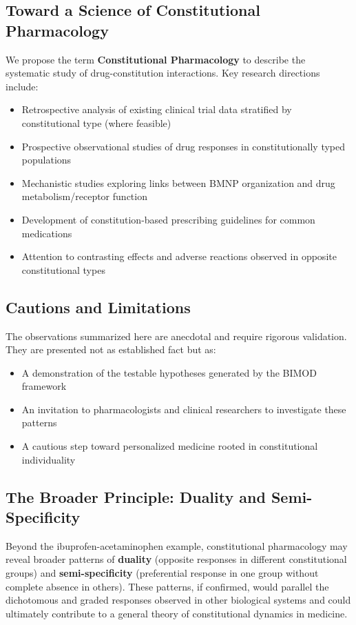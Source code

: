 \documentclass[12pt,a4paper]{article}
\begin{document}
\subsection{Toward a Science of Constitutional Pharmacology}

We propose the term \textbf{Constitutional Pharmacology} to describe the systematic study of drug-constitution interactions. Key research directions include:

\begin{itemize}
    \item Retrospective analysis of existing clinical trial data stratified by constitutional type (where feasible)
    \item Prospective observational studies of drug responses in constitutionally typed populations
    \item Mechanistic studies exploring links between BMNP organization and drug metabolism/receptor function
    \item Development of constitution-based prescribing guidelines for common medications
    \item Attention to contrasting effects and adverse reactions observed in opposite constitutional types
\end{itemize}

\subsection{Cautions and Limitations}

The observations summarized here are anecdotal and require rigorous validation. They are presented not as established fact but as:

\begin{itemize}
    \item A demonstration of the testable hypotheses generated by the BIMOD framework
    \item An invitation to pharmacologists and clinical researchers to investigate these patterns
    \item A cautious step toward personalized medicine rooted in constitutional individuality
\end{itemize}

\subsection{The Broader Principle: Duality and Semi-Specificity}

Beyond the ibuprofen-acetaminophen example, constitutional pharmacology may reveal broader patterns of \textbf{duality} (opposite responses in different constitutional groups) and \textbf{semi-specificity} (preferential response in one group without complete absence in others). These patterns, if confirmed, would parallel the dichotomous and graded responses observed in other biological systems and could ultimately contribute to a general theory of constitutional dynamics in medicine.
\end{document}
